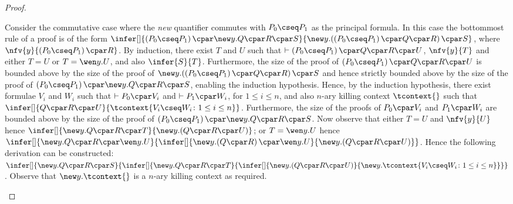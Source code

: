 \begin{proof}
\begin{enumerate}[label=\textbf{\Alph*},ref=\Alph*,leftmargin=*]
{Consider the commutative case where the \textit{new} quantifier commutes with $P_0 \cseq P_1$ as the principal formula.
In this case the bottommost rule of a proof is of the form $
\infer[]{
\left( P_0 \cseq P_1 \right) \cpar \new y. Q \cpar R \cpar S 
}{
\mathopen{\new y.} \left( \left( P_0 \cseq P_1 \right) \cpar Q \cpar R\right) \cpar S
}$,
where $\nfv{y}{\left( P_0 \cseq P_1 \right) \cpar R}$.
By induction, there exist $T$ and $U$ such that $\vdash \left( P_0 \cseq P_1 \right) \cpar Q \cpar R \cpar U$, $\nfv{y}{T}$ and either $T = U$ or $T = \wen y. U$, and also
$\infer{S}{T}$.
Furthermore, the size of the proof of $\left( P_0 \cseq P_1 \right) \cpar Q \cpar R \cpar U$ is bounded above by the size of the proof of $\mathopen{\new y.} \left( \left( P_0 \cseq P_1 \right) \cpar Q \cpar R\right) \cpar S$ and hence strictly bounded above by the size of the proof of $\left( P_0 \cseq P_1 \right) \cpar \new y. Q \cpar R \cpar S$, enabling the induction hypothesis.
Hence, by the induction hypothesis, there exist formulae $V_i$ and $W_i$ such that $\vdash P_0 \cpar V_i$ and $\vdash P_1 \cpar W_i$, for $1 \leq i \leq n$, and also $n$-ary killing context $\tcontext{}$ such that
$\infer[]{
Q \cpar R \cpar U
}{
\tcontext{ V_i \cseq W_i \colon 1 \leq i \leq n }
}$.
Furthermore, the size of the proofs of $P_0 \cpar V_i$ and $P_1 \cpar W_i$ are bounded above by the size of the proof of $\left( P_0 \cseq P_1 \right) \cpar \new y. Q \cpar R \cpar S$.
Now observe that either $T = U$ and $\nfv{y}{U}$ hence
$
\infer[]{
\new y. Q \cpar R \cpar T
}{
\mathopen{\new y.} \left(Q \cpar R \cpar U\right)
}$;
or $T = \wen y. U$ hence $
\infer[]{
\new y. Q \cpar R \cpar \wen y. U
}{
\infer[]{
 \mathopen{\new y.} \left(Q \cpar R\right) \cpar \wen y. U 
}{ \mathopen{\new y.} \left(Q \cpar R \cpar U\right)
}}$.
Hence the following derivation can be constructed:
$
\infer[]{
\new y. Q \cpar R \cpar S
}{
\infer[]{
\new y. Q \cpar R \cpar T
}{
\infer[]{
\mathopen{\new y.} \left( Q \cpar R \cpar U \right)
}{
\new y. \tcontext{ V_i \cseq W_i \colon 1 \leq i \leq n }
}}}
$.
Observe that $\new y. \tcontext{ }$ is a $n$-ary killing context as required.
\smallskip


}
\end{enumerate}
\end{proof}
